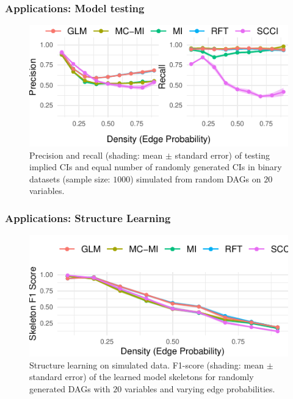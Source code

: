 \documentclass{beamer}
\begin{document}
\begin{frame}
	\frametitle{Applications: Model testing}
	\begin{figure}
		\centering
		\includegraphics{imgs/model_testing.pdf}
		\caption*{Precision and recall (shading: mean $\pm$ standard
		error) of testing implied CIs and equal number of randomly
		generated CIs in binary datasets (sample size: $1000$)
		simulated from random DAGs on $ 20 $ variables.}
	\end{figure}
\end{frame}

\begin{frame}
	\frametitle{Applications: Structure Learning}
	\begin{figure}
		\centering
		\includegraphics{imgs/sl_density.pdf}
		\caption*{Structure learning on simulated data. F1-score
		(shading: mean $\pm$ standard error) of the learned model
		skeletons for randomly generated DAGs with $20$ variables and
		varying edge probabilities.}
	\end{figure}
\end{frame}
\end{document}
